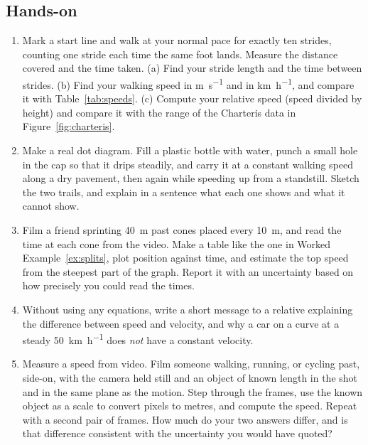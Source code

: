 \documentclass[11pt,twoside,openany]{book}
\begin{document}
\subsection*{Hands-on}
\begin{enumerate}[label=\textbf{\thechapter.\arabic*},resume=exercises,leftmargin=*]
  \item Mark a start line and walk at your normal pace for exactly ten strides, counting one stride each time the same foot lands. Measure the distance covered and the time taken. (a) Find your stride length and the time between strides. (b) Find your walking speed in \si{\metre\per\second} and in \si{\kilo\metre\per\hour}, and compare it with Table~\ref{tab:speeds}. (c) Compute your relative speed (speed divided by height) and compare it with the range of the Charteris data in Figure~\ref{fig:charteris}.
  \item Make a real dot diagram. Fill a plastic bottle with water, punch a small hole in the cap so that it drips steadily, and carry it at a constant walking speed along a dry pavement, then again while speeding up from a standstill. Sketch the two trails, and explain in a sentence what each one shows and what it cannot show.
  \item Film a friend sprinting \SI{40}{\metre} past cones placed every \SI{10}{\metre}, and read the time at each cone from the video. Make a table like the one in Worked Example~\ref{ex:splits}, plot position against time, and estimate the top speed from the steepest part of the graph. Report it with an uncertainty based on how precisely you could read the times.
  \item Without using any equations, write a short message to a relative explaining the difference between speed and velocity, and why a car on a curve at a steady \SI{50}{\kilo\metre\per\hour} does \emph{not} have a constant velocity.
  \item Measure a speed from video. Film someone walking, running, or cycling past, side-on, with the camera held still and an object of known length in the shot and in the same plane as the motion. Step through the frames, use the known object as a scale to convert pixels to metres, and compute the speed. Repeat with a second pair of frames. How much do your two answers differ, and is that difference consistent with the uncertainty you would have quoted?
\end{enumerate}
\end{document}
